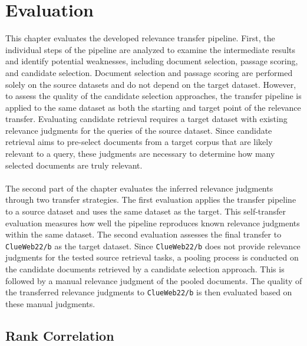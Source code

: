\chapter{Evaluation}\label{evaluation}

This chapter evaluates the developed relevance transfer pipeline. First, the \mbox{individual} steps of the pipeline are analyzed to examine the intermediate results and identify potential weaknesses, including document selection, passage scoring, and candidate selection. Document selection and passage scoring are performed solely on the source datasets and do not depend on the target dataset. However, to assess the quality of the candidate selection approaches, the transfer pipeline is applied to the same dataset as both the starting and target point of the relevance transfer. Evaluating candidate retrieval requires a target dataset with existing relevance judgments for the queries of the source dataset. Since candidate retrieval aims to pre-select documents from a target corpus that are likely relevant to a query, these judgments are necessary to determine how many selected documents are truly relevant.
\\\\
The second part of the chapter evaluates the inferred relevance judgments through two transfer strategies. The first evaluation applies the transfer pipeline to a source dataset and uses the same dataset as the target. This self-transfer evaluation measures how well the pipeline reproduces known relevance judgments within the same dataset. The second evaluation assesses the final transfer to \texttt{ClueWeb22/b} as the target dataset. Since \texttt{ClueWeb22/b} does not provide relevance judgments for the tested source retrieval tasks, a pooling process is conducted on the candidate documents retrieved by a candidate selection approach. This is followed by a manual relevance judgment of the pooled documents. The quality of the transferred relevance judgments to \texttt{ClueWeb22/b} is then evaluated based on these manual judgments.


\section{Rank Correlation}\label{rank-correlation}

